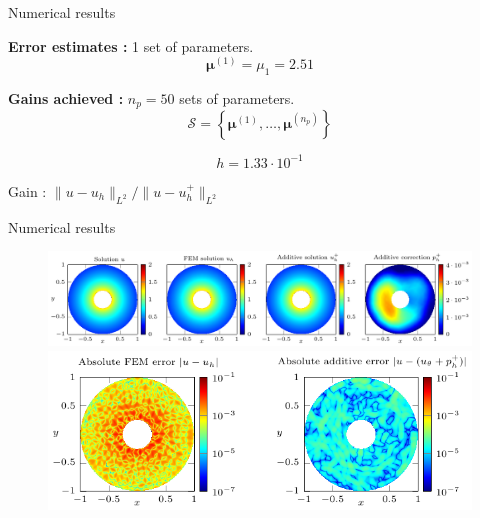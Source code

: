 \begin{frame}[noframenumbering]{Numerical results}
	\hspace{-5pt}\begin{minipage}[t]{0.46\linewidth}
		\textbf{Error estimates :} 1 set of parameters.
		$$\bm{\mu}^{(1)}=\mu_1=2.51 $$
		\vspace{-35pt}
		\begin{figure}[H]
		\end{figure}
	\end{minipage} \qquad \small
	\begin{minipage}[t]{0.48\linewidth}
		\textbf{Gains achieved :} $n_p=50$ sets of parameters.
		$$\mathcal{S}=\left\{\bm{\mu}^{(1)},\dots,\bm{\mu}^{(n_p)}\right\}$$
		\vspace{-15pt}
		\begin{table}[H]
		\end{table}

		\normalsize\centering\vspace{-20pt}
		$$h=1.33\cdot 10^{-1}$$

		\vspace{-5pt}
		Gain : $\| u-u_h\|_{L^2} / \| u-u_h^+\|_{L^2}$ \\
		\end{minipage}
\end{frame}

\begin{frame}{Numerical results}
	\begin{figure}[!ht] \centering
		\includegraphics[width=\linewidth]{images/numeric/poisson/mixed/plots/standalone_solutions.pdf}
		
		\vspace{8pt}
		\includegraphics[width=0.7\linewidth]{images/numeric/poisson/mixed/plots/standalone_errors.pdf}
	\end{figure}
\end{frame}